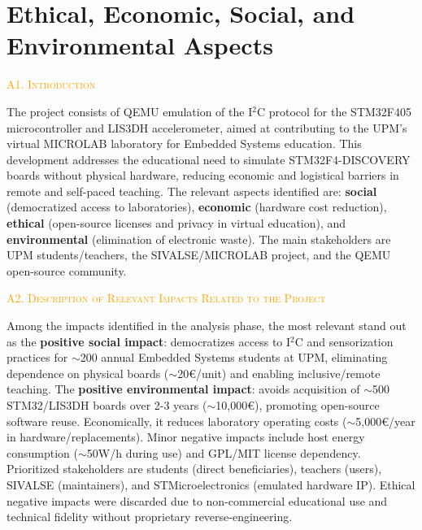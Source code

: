 \chapter{Ethical, Economic, Social, and Environmental Aspects}

\vspace{0.1cm}

\Large{\textsc{\textcolor{orange}{A1. Introduction}}} \par
\normalsize{The project consists of QEMU emulation of the I$^2$C protocol for the STM32F405 microcontroller and LIS3DH accelerometer, aimed at contributing to the UPM's virtual MICROLAB laboratory for Embedded Systems education. This development addresses the educational need to simulate STM32F4-DISCOVERY boards without physical hardware, reducing economic and logistical barriers in remote and self-paced teaching. The relevant aspects identified are: \textbf{social} (democratized access to laboratories), \textbf{economic} (hardware cost reduction), \textbf{ethical} (open-source licenses and privacy in virtual education), and \textbf{environmental} (elimination of electronic waste). The main stakeholders are UPM students/teachers, the SIVALSE/MICROLAB project, and the QEMU open-source community.}

\vspace{0.1cm}

\Large{\textsc{\textcolor{orange}{A2. Description of Relevant Impacts Related to the Project}}} \par
\vspace{0.3cm}
\normalsize{Among the impacts identified in the analysis phase, the most relevant stand out as the \textbf{positive social impact}: democratizes access to I$^2$C and sensorization practices for $\sim$200 annual Embedded Systems students at UPM, eliminating dependence on physical boards ($\sim$20€/unit) and enabling inclusive/remote teaching. The \textbf{positive environmental impact}: avoids acquisition of $\sim$500 STM32/LIS3DH boards over 2-3 years ($\sim$10,000€), promoting open-source software reuse. Economically, it reduces laboratory operating costs ($\sim$5,000€/year in hardware/replacements). Minor negative impacts include host energy consumption ($\sim$50W/h during use) and GPL/MIT license dependency. Prioritized stakeholders are students (direct beneficiaries), teachers (users), SIVALSE (maintainers), and STMicroelectronics (emulated hardware IP). Ethical negative impacts were discarded due to non-commercial educational use and technical fidelity without proprietary reverse-engineering.}

